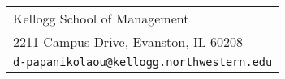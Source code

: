 \documentclass[12pt,letterpaper,serif,overlapped]{res}
\begin{document}

\setlength{\leftmargini}{0em}
\renewcommand{\labelitemi}{}

\renewcommand{\namefont}{\large\textbf}





\begin{resume}

\hrulefill

\begin{center}
\begin{tabular}{l}\\[-1.25cm]
   Kellogg School of Management            \\
  2211 Campus Drive,
  Evanston, IL 60208               \\
  {\tt d-papanikolaou@kellogg.northwestern.edu}  \\
\end{tabular}
\end{center}






\end{resume}
\end{document}
